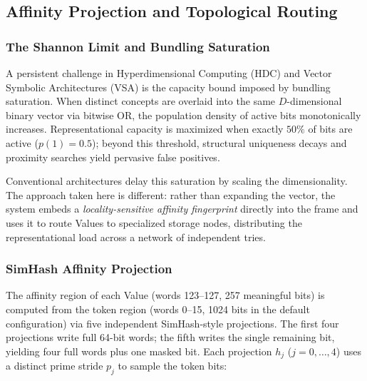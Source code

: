 \subsection{Affinity Projection and Topological Routing}
\label{sec:entropy_routing}

\subsubsection{The Shannon Limit and Bundling Saturation}

A persistent challenge in Hyperdimensional Computing (HDC) and Vector
Symbolic Architectures (VSA) is the capacity bound imposed by
bundling saturation.  When distinct concepts are overlaid into the same
$D$-dimensional binary vector via bitwise OR, the population density of
active bits monotonically increases.  Representational capacity is
maximized when exactly $50\%$ of bits are active ($p(1) = 0.5$); beyond
this threshold, structural uniqueness decays and proximity searches
yield pervasive false positives.

Conventional architectures delay this saturation by scaling the
dimensionality.  The approach taken here is different: rather than
expanding the vector, the system embeds a \emph{locality-sensitive
affinity fingerprint} directly into the frame and uses it to route
Values to specialized storage nodes, distributing the representational
load across a network of independent tries.

\subsubsection{SimHash Affinity Projection}
\label{sec:simhash}

The affinity region of each Value (words 123--127, 257 meaningful bits)
is computed from the token region (words 0--15, 1024 bits in the default
configuration) via five independent SimHash-style projections.  The
first four projections write full 64-bit words; the fifth writes the
single remaining bit, yielding four full words plus one masked bit.  Each
projection $h_j$ ($j = 0, \ldots, 4$) uses a distinct prime stride $p_j$
to sample the token bits:

